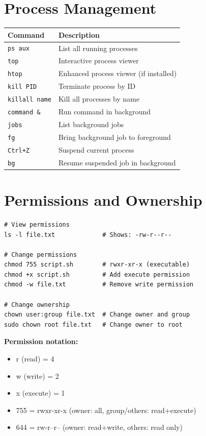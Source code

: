 \documentclass[11pt]{article}
\begin{document}
\section{Process Management}

\begin{center}
\begin{tabular}{ll}
\toprule
Command & Description \\
\midrule
\texttt{ps aux} & List all running processes \\
\texttt{top} & Interactive process viewer \\
\texttt{htop} & Enhanced process viewer (if installed) \\
\texttt{kill PID} & Terminate process by ID \\
\texttt{killall name} & Kill all processes by name \\
\texttt{command \&} & Run command in background \\
\texttt{jobs} & List background jobs \\
\texttt{fg} & Bring background job to foreground \\
\texttt{Ctrl+Z} & Suspend current process \\
\texttt{bg} & Resume suspended job in background \\
\bottomrule
\end{tabular}
\end{center}

\section{Permissions and Ownership}

\begin{lstlisting}
# View permissions
ls -l file.txt             # Shows: -rw-r--r--

# Change permissions
chmod 755 script.sh        # rwxr-xr-x (executable)
chmod +x script.sh         # Add execute permission
chmod -w file.txt          # Remove write permission

# Change ownership
chown user:group file.txt  # Change owner and group
sudo chown root file.txt   # Change owner to root
\end{lstlisting}

\textbf{Permission notation:}
\begin{itemize}
    \item r (read) = 4
    \item w (write) = 2
    \item x (execute) = 1
    \item 755 = rwxr-xr-x (owner: all, group/others: read+execute)
    \item 644 = rw-r--r-- (owner: read+write, others: read only)
\end{itemize}
\end{document}
